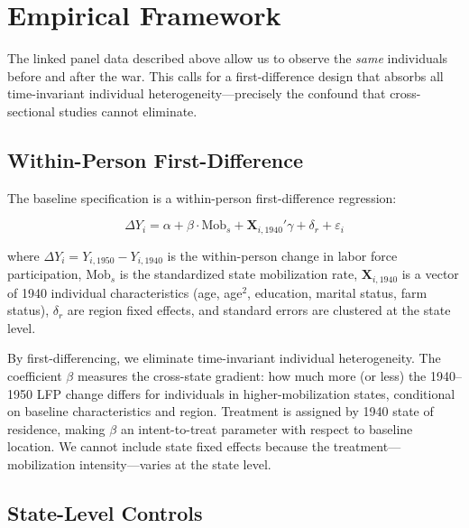 \documentclass[12pt]{article}
\begin{document}

\section{Empirical Framework}
\label{sec:framework}

The linked panel data described above allow us to observe the \textit{same} individuals before and after the war. This calls for a first-difference design that absorbs all time-invariant individual heterogeneity---precisely the confound that cross-sectional studies cannot eliminate.

\subsection{Within-Person First-Difference}

The baseline specification is a within-person first-difference regression:

\begin{equation}
\Delta Y_i = \alpha + \beta \cdot \text{Mob}_s + \mathbf{X}_{i,1940}' \gamma + \delta_r + \varepsilon_i
\label{eq:fd}
\end{equation}

\noindent where $\Delta Y_i = Y_{i,1950} - Y_{i,1940}$ is the within-person change in labor force participation, $\text{Mob}_s$ is the standardized state mobilization rate, $\mathbf{X}_{i,1940}$ is a vector of 1940 individual characteristics (age, age$^2$, education, marital status, farm status), $\delta_r$ are region fixed effects, and standard errors are clustered at the state level.

By first-differencing, we eliminate time-invariant individual heterogeneity. The coefficient $\beta$ measures the cross-state gradient: how much more (or less) the 1940--1950 LFP change differs for individuals in higher-mobilization states, conditional on baseline characteristics and region. Treatment is assigned by 1940 state of residence, making $\beta$ an intent-to-treat parameter with respect to baseline location. We cannot include state fixed effects because the treatment---mobilization intensity---varies at the state level.

\subsection{State-Level Controls}
\end{document}

